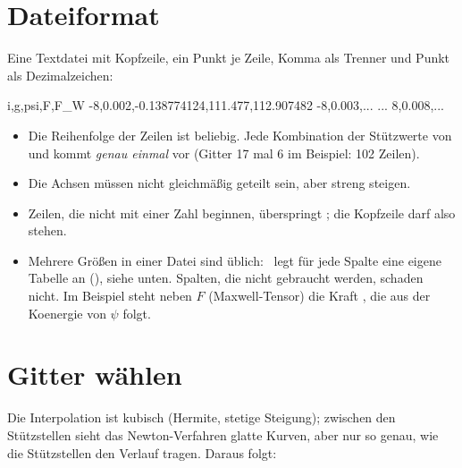 \section{Dateiformat}
\label{sec:kennfeld-datei}

Eine Textdatei mit Kopfzeile, ein Punkt je Zeile, Komma als Trenner und Punkt
als Dezimalzeichen:

\begin{shell}
i,g,psi,F,F_W
-8,0.002,-0.138774124,111.477,112.907482
-8,0.003,...
...
 8,0.008,...
\end{shell}

\begin{itemize}
  \item Die Reihenfolge der Zeilen ist beliebig. Jede Kombination der Stützwerte
    von  und  kommt \emph{genau einmal} vor (Gitter 17 mal 6
    im Beispiel: 102 Zeilen).
  \item Die Achsen müssen nicht gleichmäßig geteilt sein, aber streng steigen.
  \item Zeilen, die nicht mit einer Zahl beginnen, überspringt \esim; die
    Kopfzeile darf also stehen.
  \item Mehrere Größen in einer Datei sind üblich: \esim\ legt für jede Spalte
    eine eigene Tabelle an (), siehe unten. Spalten, die nicht
    gebraucht werden, schaden nicht. Im Beispiel steht neben $F$ (Maxwell-Tensor)
    die Kraft , die aus der Koenergie von $\psi$ folgt.
\end{itemize}

\section{Gitter wählen}
\label{sec:kennfeld-gitter}

Die Interpolation ist kubisch (Hermite, stetige Steigung); zwischen den
Stützstellen sieht das Newton-Verfahren glatte Kurven, aber nur so genau, wie
die Stützstellen den Verlauf tragen. Daraus folgt:

